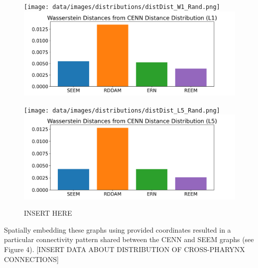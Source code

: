 \begin{figure}[h]
    \texttt{[image: data/images/distributions/distDist\_W1\_Rand.png]}
    \includegraphics[width=0.24\linewidth]{data/images/compareDistributions/wassersteinDistances_Distance_L1_2.png}

    \texttt{[image: data/images/distributions/distDist\_L5\_Rand.png]}
    \includegraphics[width=0.24\linewidth]{data/images/compareDistributions/wassersteinDistances_Distance_L5_2.png}
  \caption{INSERT HERE}
\end{figure}

Spatially embedding these graphs using provided coordinates resulted in a particular connectivity pattern shared between the CENN and SEEM graphs (see Figure 4). [INSERT DATA ABOUT DISTRIBUTION OF CROSS-PHARYNX CONNECTIONS]